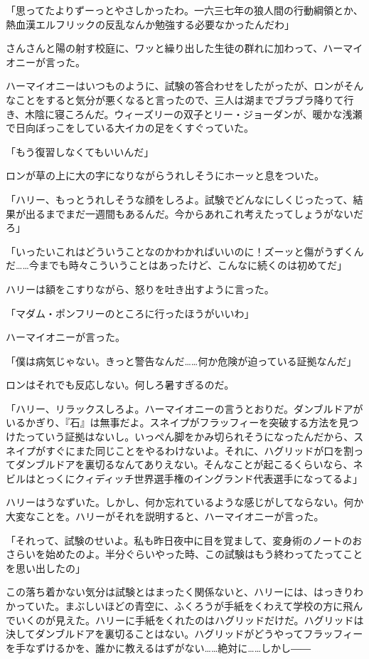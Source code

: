 \documentclass[10pt,a4paper]{article}
\begin{document}
\begin{CJK}{UTF8}{min}
「思ってたよりずーっとやさしかったわ。一六三七年の狼人間の行動綱領とか、熱血漢エルフリックの反乱なんか勉強する必要なかったんだわ」

さんさんと陽の射す校庭に、ワッと繰り出した生徒の群れに加わって、ハーマイオニーが言った。

ハーマイオニーはいつものように、試験の答合わせをしたがったが、ロンがそんなことをすると気分が悪くなると言ったので、三人は湖までブラブラ降りて行き、木陰に寝ころんだ。ウィーズリーの双子とリー・ジョーダンが、暖かな浅瀬で日向ぼっこをしている大イカの足をくすぐっていた。

「もう復習しなくてもいいんだ」

ロンが草の上に大の字になりながらうれしそうにホーッと息をついた。

「ハリー、もっとうれしそうな顔をしろよ。試験でどんなにしくじったって、結果が出るまでまだ一週間もあるんだ。今からあれこれ考えたってしょうがないだろ」

「いったいこれはどういうことなのかわかればいいのに！ズーッと傷がうずくんだ……今までも時々こういうことはあったけど、こんなに続くのは初めてだ」

ハリーは額をこすりながら、怒りを吐き出すように言った。

「マダム・ポンフリーのところに行ったほうがいいわ」

ハーマイオニーが言った。

「僕は病気じゃない。きっと警告なんだ……何か危険が迫っている証拠なんだ」

ロンはそれでも反応しない。何しろ暑すぎるのだ。

「ハリー、リラックスしろよ。ハーマイオニーの言うとおりだ。ダンブルドアがいるかぎり、『石』は無事だよ。スネイプがフラッフィーを突破する方法を見つけたっていう証拠はないし。いっぺん脚をかみ切られそうになったんだから、スネイプがすぐにまた同じことをやるわけないよ。それに、ハグリッドが口を割ってダンブルドアを裏切るなんてありえない。そんなことが起こるくらいなら、ネビルはとっくにクィディッチ世界選手権のイングランド代表選手になってるよ」

ハリーはうなずいた。しかし、何か忘れているような感じがしてならない。何か大変なことを。ハリーがそれを説明すると、ハーマイオニーが言った。

「それって、試験のせいよ。私も昨日夜中に目を覚まして、変身術のノートのおさらいを始めたのよ。半分ぐらいやった時、この試験はもう終わってたってことを思い出したの」

この落ち着かない気分は試験とはまったく関係ないと、ハリーには、はっきりわかっていた。まぶしいほどの青空に、ふくろうが手紙をくわえて学校の方に飛んでいくのが見えた。ハリーに手紙をくれたのはハグリッドだけだ。ハグリッドは決してダンブルドアを裏切ることはない。ハグリッドがどうやってフラッフィーを手なずけるかを、誰かに教えるはずがない……絶対に……しかし――


\end{CJK}
\end{document}
